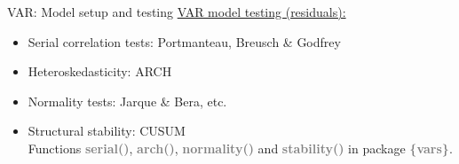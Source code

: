 \documentclass[usenames,dvipsnames]{beamer}
\begin{document}
\begin{frame}{VAR: Model setup and testing}
\underline{VAR model testing (residuals):}
\vspace*{4mm}
\begin{itemize}
\item Serial correlation tests: Portmanteau, Breusch \& Godfrey
\item Heteroskedasticity: ARCH
\item Normality tests: Jarque \& Bera, etc.
\item Structural stability: CUSUM \\
\vspace{0.5cm}
Functions \textbf{\textcolor{Gray}{serial()}}, \textbf{\textcolor{Gray}{arch()}}, \textbf{\textcolor{Gray}{normality()}} and \textbf{\textcolor{Gray}{stability()}} in package \textbf{\textcolor{Gray}{\{vars\}}}.
\end{itemize}
\end{frame}
\end{document}
